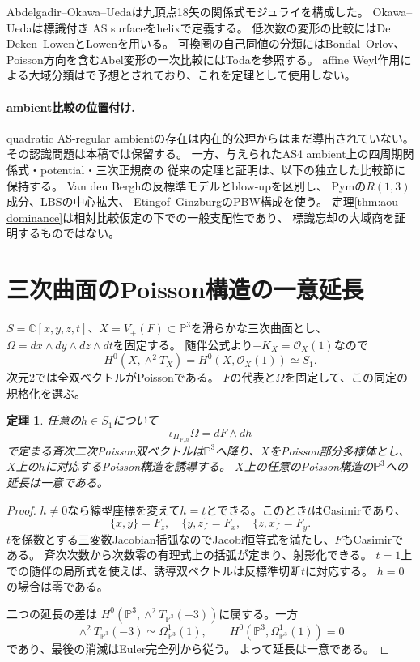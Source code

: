 \documentclass[11pt,a4paper]{ltjsarticle}
\newtheorem{theorem}{定理}[section]
\theoremstyle{definition}\newtheorem{remark}[theorem]{注意}
\newcommand{\PP}{\mathbb P}\newcommand{\kk}{\mathbb C}
\newcommand{\OO}{\mathcal O}\newcommand{\rank}{\operatorname{rank}}
\begin{document}
Abdelgadir--Okawa--Ueda\cite{AOU}は九頂点18矢の関係式モジュライを構成した。
Okawa--Ueda\cite{OU2025}は標識付き AS surfaceをhelixで定義する。
低次数の変形の比較にはDe Deken--Lowen\cite{DDL}とLowen\cite{Lowen}を用いる。
可換圏の自己同値の分類にはBondal--Orlov\cite{BO}、
Poisson方向を含むAbel変形の一次比較にはToda\cite{Toda}を参照する。
affine Weyl作用による大域分類は\cite{OWR}で予想とされており、これを定理として使用しない。

\paragraph{ambient比較の位置付け.}
quadratic AS-regular ambientの存在は内在的公理からはまだ導出されていない。
その認識問題は本稿では保留する。
一方、与えられたAS4 ambient上の四周期関係式・potential・三次正規商の
従来の定理と証明は、以下の独立した比較節に保持する。
Van den Bergh\cite[Chapter 12]{VdB}の反標準モデルとblow-upを区別し、
Pym\cite[\S3.4]{Pym}の$R(1,3)$成分、LBS\cite{LBS}の中心拡大、
Etingof--Ginzburg\cite{EG}のPBW構成を使う。
定理\ref{thm:aou-dominance}は相対比較仮定の下での一般支配性であり、
標識忘却の大域商を証明するものではない。




\section{三次曲面のPoisson構造の一意延長}
$S=\kk[x,y,z,t]$、$X=V_+(F)\subset\PP^3$を滑らかな三次曲面とし、
$\Omega=dx\wedge dy\wedge dz\wedge dt$を固定する。
随伴公式より$-K_X=\OO_X(1)$なので
\[
 H^0(X,\wedge^2T_X)=H^0(X,\OO_X(1))\simeq S_1.
\]
次元2では全双ベクトルがPoissonである。
$F$の代表と$\Omega$を固定して、この同定の規格化を選ぶ。

\begin{theorem}\label{thm:extension}
任意の$h\in S_1$について
\[
 \iota_{\Pi_{F,h}}\Omega=dF\wedge dh
\]
で定まる斉次二次Poisson双ベクトルは$\PP^3$へ降り、$X$をPoisson部分多様体とし、
$X$上の$h$に対応するPoisson構造を誘導する。
$X$上の任意のPoisson構造の$\PP^3$への延長は一意である。
\end{theorem}
\begin{proof}
$h\ne0$なら線型座標を変えて$h=t$とできる。このとき$t$はCasimirであり、
\[
 \{x,y\}=F_z,\quad\{y,z\}=F_x,\quad\{z,x\}=F_y.
\]
$t$を係数とする三変数Jacobian括弧なのでJacobi恒等式を満たし、$F$もCasimirである。
斉次次数から次数零の有理式上の括弧が定まり、射影化できる。
$t=1$上での随伴の局所式を使えば、誘導双ベクトルは反標準切断$t$に対応する。
$h=0$の場合は零である。

二つの延長の差は
$H^0(\PP^3,\wedge^2T_{\PP^3}(-3))$に属する。一方
\[
 \wedge^2T_{\PP^3}(-3)\simeq\Omega^1_{\PP^3}(1),\qquad
 H^0(\PP^3,\Omega^1_{\PP^3}(1))=0
\]
であり、最後の消滅はEuler完全列から従う。
よって延長は一意である。
\end{proof}
\end{document}
